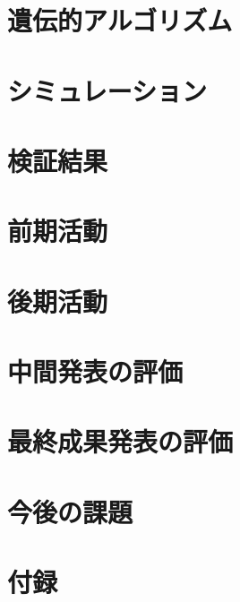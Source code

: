 \documentclass[11pt,a4paper,oneside]{jsbook}
\begin{document}
\chapter{遺伝的アルゴリズム}


\chapter{シミュレーション}



\chapter{検証結果}




\chapter{前期活動}

%
\chapter{後期活動}

\chapter{中間発表の評価}

\chapter{最終成果発表の評価}

\chapter{今後の課題}




\chapter{付録}


%
%
%
\end{document}
